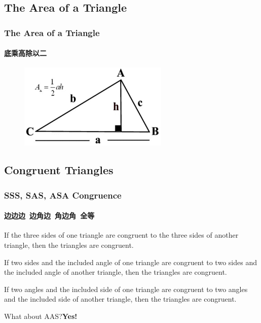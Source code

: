 \documentclass[
	11pt, %
	handout,
]{beamer}
\begin{document}

\subsection{The Area of a Triangle}


\begin{frame}
	\frametitle{The Area of a Triangle} %
	\framesubtitle{底乘高除以二}
	\begin{figure}
		\includegraphics[width=0.5\linewidth]{Area_Triangle.png}
	\end{figure}	
\end{frame}


\subsection{Congruent Triangles}


\begin{frame}
	\frametitle{SSS, SAS, ASA Congruence} %
	\framesubtitle{边边边\ 边角边\ 角边角\ 全等}
			\begin{theorem}
				If the three sides of one triangle are congruent to the three
sides of another triangle, then the triangles are congruent.
			\end{theorem}

			\begin{theorem}
				If two sides and the included angle of one triangle are
congruent to two sides and the included angle of another triangle,
then the triangles are congruent.
			\end{theorem}

			\begin{theorem}
				If two angles and the included side of one triangle are
congruent to two angles and the included side of another triangle,
then the triangles are congruent.
			\end{theorem}
What about AAS?\pause \alert{\textbf{Yes!}}
\end{frame}
\end{document}
